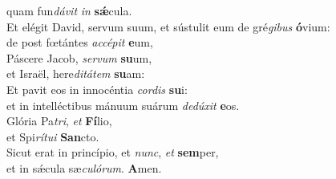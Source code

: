 \oddverse quam fun\textit{dá}\textit{vit} \textit{in} \textbf{sǽ}cula.\\
\evenverse Et elégit David, servum suum, et sústulit eum de gré\textit{gi}\textit{bus} \textbf{ó}vium:~\*\\
\evenverse de post fœtántes \textit{ac}\textit{cé}\textit{pit} \textbf{e}um,\\
\oddverse Páscere Jacob, \textit{ser}\textit{vum} \textbf{su}um,~\*\\
\oddverse et Israël, here\textit{di}\textit{tá}\textit{tem} \textbf{su}am:\\
\evenverse Et pavit eos in innocéntia \textit{cor}\textit{dis} \textbf{su}i:~\*\\
\evenverse et in intelléctibus mánuum suárum \textit{de}\textit{dú}\textit{xit} \textbf{e}os.\\
\oddverse Glória Pa\textit{tri}, \textit{et} \textbf{Fí}lio,~\*\\
\oddverse et Spi\textit{rí}\textit{tu}\textit{i} \textbf{San}cto.\\
\evenverse Sicut erat in princípio, et \textit{nunc}, \textit{et} \textbf{sem}per,~\*\\
\evenverse et in sǽcula sæ\textit{cu}\textit{ló}\textit{rum}. \textbf{A}men.\\
